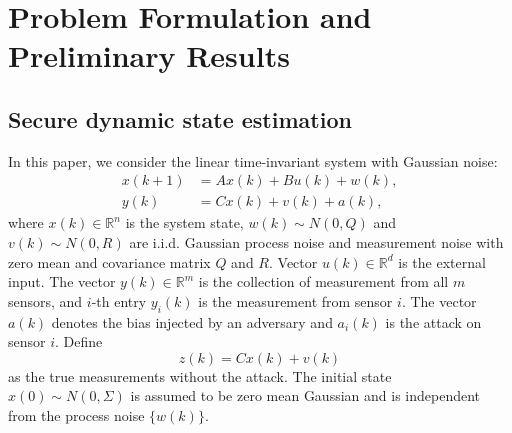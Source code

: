 \documentclass[12pt]{article}  %
\begin{document}
\section{Problem Formulation and Preliminary Results}\label{sec:problem}	
\subsection{Secure dynamic state estimation}
In this paper, we consider the linear time-invariant system with Gaussian noise:
\begin{align}
x(k+1)&=A x(k)+Bu(k)+w(k) , \label{eq:system} \\
y(k)&=C x(k)+v(k)+a(k) ,\label{eq:y_i_def}
\end{align}
where $x(k) \in \mathbb{R}^{n}$ is the system state, $w(k) \sim {N}(0, Q)$ and $v(k) \sim {N}(0, R)$ are i.i.d. Gaussian process noise and measurement noise with zero mean and covariance matrix $Q$ and $R$.  
Vector $u(k)\in \mathbb{R}^{d}$ is the external input.  
The vector $y(k)\in \mathbb{R}^{m}$ is the collection of measurement from all $m$ sensors, and $i$-th entry $y_i(k)$ is the measurement from sensor $i$.
The vector $a(k)$ denotes the bias injected by an adversary and $a_i(k)$ is the attack on sensor $i$. Define $$z(k)=C x(k)+v(k)$$ as the true measurements without the attack.
The initial state $x(0) \sim {N}(0, \Sigma)$ is assumed to be zero mean Gaussian and is independent from the process noise $\{w(k)\}$.
\end{document}
